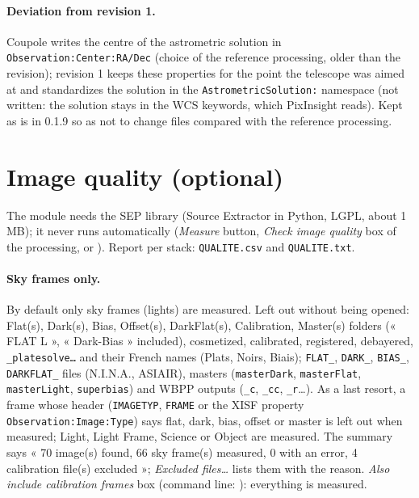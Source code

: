 \paragraph{Deviation from revision 1.} Coupole writes the centre of the astrometric solution in
\texttt{Observation:Center:RA/Dec} (choice of the reference processing, older than the revision); revision 1 keeps
these properties for the point the telescope was aimed at and standardizes the solution in the
\texttt{AstrometricSolution:} namespace (not written: the solution stays in the WCS keywords, which PixInsight reads).
Kept as is in 0.1.9 so as not to change files compared with the reference processing.

\section{Image quality (optional)}\label{sec:qualite}
The module needs the SEP library (Source Extractor in Python, LGPL, about 1 MB); it never runs automatically
(\emph{Measure} button, \emph{Check image quality} box of the processing, or ).
Report per stack: \texttt{QUALITE.csv} and \texttt{QUALITE.txt}.

\paragraph{Sky frames only.} By default only sky frames (lights) are measured. Left out without being opened:
Flat(s), Dark(s), Bias, Offset(s), DarkFlat(s), Calibration, Master(s) folders (« FLAT L », « Dark-Bias »
included), cosmetized, calibrated, registered, debayered, \texttt{\_platesolve…} and their French names (Plats,
Noirs, Biais); \texttt{FLAT\_}, \texttt{DARK\_}, \texttt{BIAS\_}, \texttt{DARKFLAT\_} files (N.I.N.A., ASIAIR),
masters (\texttt{masterDark}, \texttt{masterFlat}, \texttt{masterLight}, \texttt{superbias}) and WBPP outputs
(\texttt{\_c}, \texttt{\_cc}, \texttt{\_r}…). As a last resort, a frame whose header (\texttt{IMAGETYP},
\texttt{FRAME} or the XISF property \texttt{Observation:Image:Type}) says flat, dark, bias, offset or master is left
out when measured; Light, Light Frame, Science or Object are measured. The summary says « 70 image(s) found, 66 sky
frame(s) measured, 0 with an error, 4 calibration file(s) excluded »; \emph{Excluded files…} lists them with the
reason. \emph{Also include calibration frames} box (command line: ): everything is
measured.

